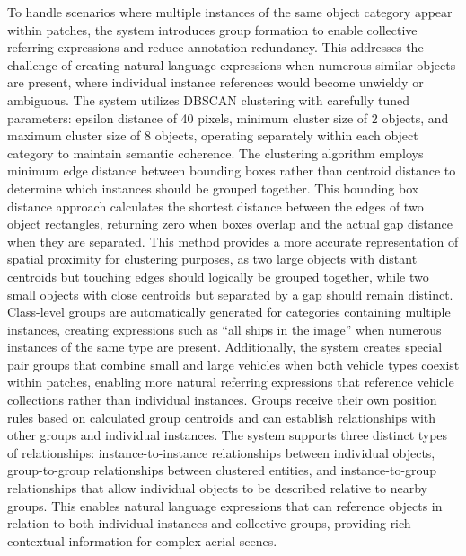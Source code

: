 To handle scenarios where multiple instances of the same object category appear within patches, the system introduces group formation to enable collective referring expressions and reduce annotation redundancy. This addresses the challenge of creating natural language expressions when numerous similar objects are present, where individual instance references would become unwieldy or ambiguous. The system utilizes DBSCAN clustering with carefully tuned parameters: epsilon distance of 40 pixels, minimum cluster size of 2 objects, and maximum cluster size of 8 objects, operating separately within each object category to maintain semantic coherence. The clustering algorithm employs minimum edge distance between bounding boxes rather than centroid distance to determine which instances should be grouped together. This bounding box distance approach calculates the shortest distance between the edges of two object rectangles, returning zero when boxes overlap and the actual gap distance when they are separated. This method provides a more accurate representation of spatial proximity for clustering purposes, as two large objects with distant centroids but touching edges should logically be grouped together, while two small objects with close centroids but separated by a gap should remain distinct. Class-level groups are automatically generated for categories containing multiple instances, creating expressions such as ``all ships in the image'' when numerous instances of the same type are present. Additionally, the system creates special pair groups that combine small and large vehicles when both vehicle types coexist within patches, enabling more natural referring expressions that reference vehicle collections rather than individual instances. Groups receive their own position rules based on calculated group centroids and can establish relationships with other groups and individual instances. The system supports three distinct types of relationships: instance-to-instance relationships between individual objects, group-to-group relationships between clustered entities, and instance-to-group relationships that allow individual objects to be described relative to nearby groups. This enables natural language expressions that can reference objects in relation to both individual instances and collective groups, providing rich contextual information for complex aerial scenes.

